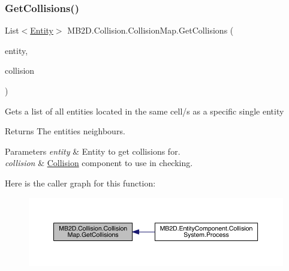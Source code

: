 \subsubsection{\texorpdfstring{Get\+Collisions()}{GetCollisions()}}
{\footnotesize\ttfamily List$<$\hyperlink{class_m_b2_d_1_1_entity_component_1_1_entity}{Entity}$>$ M\+B2\+D.\+Collision.\+Collision\+Map.\+Get\+Collisions (\begin{DoxyParamCaption}\item[{\hyperlink{class_m_b2_d_1_1_entity_component_1_1_entity}{Entity}}]{entity,  }\item[{\hyperlink{class_m_b2_d_1_1_entity_component_1_1_collision_component}{Collision\+Component}}]{collision }\end{DoxyParamCaption})\hspace{0.3cm}{\ttfamily [inline]}}



Gets a list of all entities located in the same cell/s as a specific single entity 

\begin{DoxyReturn}{Returns}
The entities neighbours.
\end{DoxyReturn}

\begin{DoxyParams}{Parameters}
{\em entity} & Entity to get collisions for.\\
\hline
{\em collision} & \hyperlink{namespace_m_b2_d_1_1_collision}{Collision} component to use in checking.\\
\hline
\end{DoxyParams}
Here is the caller graph for this function\+:\nopagebreak
\begin{figure}[H]
\begin{center}
\leavevmode
\includegraphics[width=350pt]{class_m_b2_d_1_1_collision_1_1_collision_map_acbc6d9d9bb85342cf8f07c22f6947b27_icgraph}
\end{center}
\end{figure}
\hypertarget{class_m_b2_d_1_1_collision_1_1_collision_map_adb3b318fb729bd02cda21a450e504465}{}\label{class_m_b2_d_1_1_collision_1_1_collision_map_adb3b318fb729bd02cda21a450e504465} 
